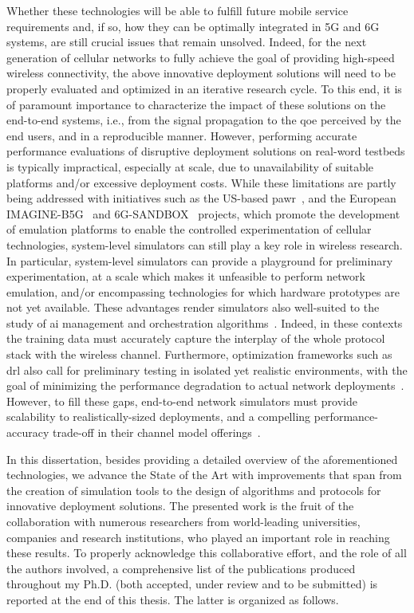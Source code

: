 Whether these technologies will be able to fulfill future mobile service requirements and, if so, how they can be optimally integrated in 5G and 6G systems, are still crucial issues that remain unsolved. 
Indeed, for the next generation of cellular networks to fully achieve the goal of providing high-speed wireless connectivity, the above innovative deployment solutions will need to be properly evaluated and optimized in an iterative research cycle. To this end, it is of paramount importance to characterize the impact of these solutions on the end-to-end systems, i.e., from the signal propagation to the \gls{qoe} perceived by the end users, and in a reproducible manner.
However, performing accurate performance evaluations of disruptive deployment solutions on real-word testbeds is typically impractical, especially at scale, due to unavailability of suitable platforms and/or excessive deployment costs.
While these limitations are partly being addressed with initiatives such as the US-based \gls{pawr}~\cite{BONATI2023109502}, and the European IMAGINE-B5G~\cite{10597052} and 6G-SANDBOX~\cite{10597112} projects, which promote the development of emulation platforms to enable the controlled experimentation of cellular technologies, system-level simulators can still play a key role in wireless research.
In particular, system-level simulators can provide a playground for preliminary experimentation, at a scale which makes it unfeasible to perform network emulation, and/or encompassing technologies for which hardware prototypes are not yet available. 
These advantages render simulators also well-suited to the study of \gls{ai} management and orchestration algorithms~\cite{polese2022colo}.
Indeed, in these contexts the training data must accurately capture the interplay of the whole protocol stack with the wireless channel. Furthermore, optimization frameworks such as \gls{drl} also call for preliminary testing in isolated yet realistic environments, with the goal of minimizing the performance degradation to actual network deployments~\cite{lacava2023programmable, amir2023safehaul}.
However, to fill these gaps, end-to-end network simulators must provide scalability to realistically-sized deployments, and a compelling performance-accuracy trade-off in their channel model offerings~\cite{testolina2020scalable}.

In this dissertation, besides providing a detailed overview of the aforementioned technologies, we advance the State of the Art with improvements that span from the creation of simulation tools to the design of algorithms and protocols for innovative deployment solutions.
The presented work is the fruit of the collaboration with numerous researchers from world-leading universities, companies and research institutions, who played an important role in reaching these results. To properly acknowledge this collaborative effort, and the role of all the
authors involved, a comprehensive list of the publications produced throughout my Ph.D. (both accepted, under review and to be submitted) is reported at the end of this thesis. The latter is organized as follows.

